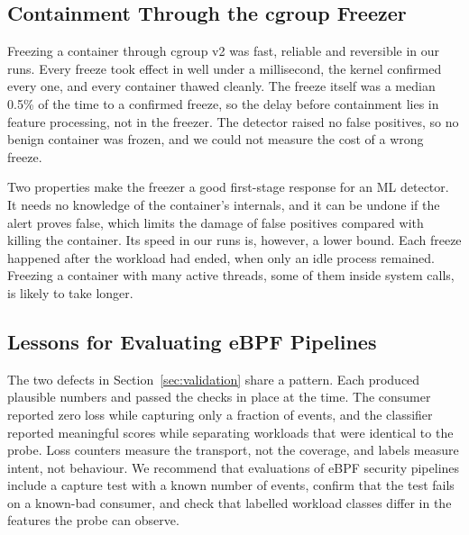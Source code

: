 \subsection{Containment Through the cgroup Freezer}

Freezing a container through cgroup v2 was fast, reliable and reversible in our runs. Every freeze took effect in well under a millisecond, the kernel confirmed every one, and every container thawed cleanly. The freeze itself was a median 0.5\% of the time to a confirmed freeze, so the delay before containment lies in feature processing, not in the freezer. The detector raised no false positives, so no benign container was frozen, and we could not measure the cost of a wrong freeze.

Two properties make the freezer a good first-stage response for an ML detector. It needs no knowledge of the container's internals, and it can be undone if the alert proves false, which limits the damage of false positives compared with killing the container. Its speed in our runs is, however, a lower bound. Each freeze happened after the workload had ended, when only an idle process remained. Freezing a container with many active threads, some of them inside system calls, is likely to take longer.

\subsection{Lessons for Evaluating eBPF Pipelines}

The two defects in Section~\ref{sec:validation} share a pattern. Each produced plausible numbers and passed the checks in place at the time. The consumer reported zero loss while capturing only a fraction of events, and the classifier reported meaningful scores while separating workloads that were identical to the probe. Loss counters measure the transport, not the coverage, and labels measure intent, not behaviour. We recommend that evaluations of eBPF security pipelines include a capture test with a known number of events, confirm that the test fails on a known-bad consumer, and check that labelled workload classes differ in the features the probe can observe.
